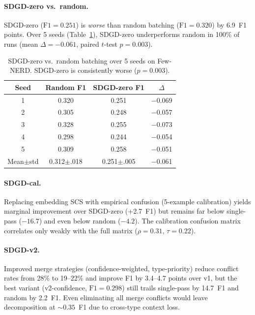 \documentclass[11pt,a4paper]{article}
\begin{document}
\paragraph{SDGD-zero vs.\ random.} SDGD-zero ($\text{F1}{=}0.251$) is \emph{worse} than random batching ($\text{F1}{=}0.320$) by 6.9~F1 points. Over 5 seeds (Table~\ref{tab:sdgd_seeds}), SDGD-zero underperforms random in 100\% of runs (mean $\Delta{=}{-}0.061$, paired $t$-test $p{=}0.003$).

\begin{table}[t]
\centering
\small
\begin{tabular}{cccc}
\toprule
Seed & Random F1 & SDGD-zero F1 & $\Delta$ \\
\midrule
1 & 0.320 & 0.251 & $-$0.069 \\
2 & 0.305 & 0.248 & $-$0.057 \\
3 & 0.328 & 0.255 & $-$0.073 \\
4 & 0.298 & 0.244 & $-$0.054 \\
5 & 0.309 & 0.258 & $-$0.051 \\
\midrule
Mean$\pm$std & 0.312$\pm$.018 & 0.251$\pm$.005 & $-$0.061 \\
\bottomrule
\end{tabular}
\caption{SDGD-zero vs.\ random batching over 5 seeds on Few-NERD. SDGD-zero is consistently worse ($p{=}0.003$).}
\label{tab:sdgd_seeds}
\end{table}

\paragraph{SDGD-cal.} Replacing embedding SCS with empirical confusion (5-example calibration) yields marginal improvement over SDGD-zero (+2.7~F1) but remains far below single-pass ($-16.7$) and even below random ($-4.2$). The calibration confusion matrix correlates only weakly with the full matrix ($\rho{=}0.31$, $\tau{=}0.22$).

\paragraph{SDGD-v2.} Improved merge strategies (confidence-weighted, type-priority) reduce conflict rates from 28\% to 19--22\% and improve F1 by 3.4--4.7 points over v1, but the best variant (v2-confidence, $\text{F1}{=}0.298$) still trails single-pass by 14.7~F1 and random by 2.2~F1. Even eliminating all merge conflicts would leave decomposition at ${\sim}0.35$~F1 due to cross-type context loss.
\end{document}
